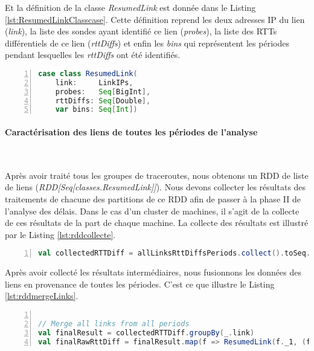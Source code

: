 Et la définition de la classe \textit{ResumedLink} est donnée dans le Listing \ref{lst:ResumedLinkClasscase}. Cette définition reprend les deux  adresses IP du lien (\textit{link}), la liste des sondes ayant identifié ce lien (\textit{probes}), la liste des RTTs différentiels de ce lien (\textit{rttDiffs}) et enfin les \textit{bins} qui  représentent les périodes  pendant lesquelles les \textit{rttDiffs} ont été identifiés.
\begin{lstlisting}[language=scala,firstnumber=1, caption={Définition de la classe ResumedLink},label={lst:ResumedLinkClasscase}, basicstyle = \footnotesize,escapechar=|,numbers=left,
stepnumber=1]
case class ResumedLink(
	link:     LinkIPs,
	probes:   Seq[BigInt],
	rttDiffs: Seq[Double],
	var bins: Seq[Int])
\end{lstlisting}


\paragraph{Caractérisation des liens de toutes les périodes de l'analyse}~

Après avoir traité tous les groupes de traceroutes, nous obtenons un RDD de liste de liens (\textit{RDD[Seq[classes.ResumedLink]]}). Nous devons collecter les résultats des traitements de chacune des partitions de ce RDD afin de passer à la phase II de l'analyse des délais. Dans le cas d'un cluster de machines, il s'agit de la collecte de ces résultats de la part de chaque machine.  La collecte des résultats est illustré par le Listing \ref{lst:rddcollecte}.

\begin{lstlisting}[language=scala,firstnumber=1, caption={Deduction des liens par groupe de traceroutes},label={lst:rddcollecte}, basicstyle = \footnotesize,escapechar=|,numbers=left,
stepnumber=1]
val collectedRTTDiff = allLinksRttDiffsPeriods.collect().toSeq.flatten
\end{lstlisting}


Après avoir collecté les résultats intermédiaires, nous fusionnons les données des liens en provenance de toutes les périodes. C'est ce que illustre le Listing \ref{lst:rddmergeLinks}.

\begin{lstlisting}[language=scala,firstnumber=1, caption={Fusion des liens de toute la période de l'analyse},label={lst:rddmergeLinks}, basicstyle = \footnotesize,escapechar=|,numbers=left,
stepnumber=1]

// Merge all links from all periods
val finalResult = collectedRTTDiff.groupBy(_.link)
val finalRawRttDiff = finalResult.map(f => ResumedLink(f._1, (f._2.map(_.probes)).flatten, (f._2.map(_.rttDiffs)).flatten, (f._2.map(_.bins)).flatten))
\end{lstlisting}


